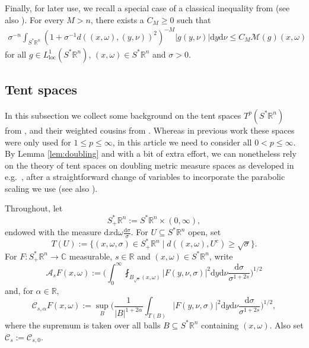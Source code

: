 \documentclass{amsart}
\newcommand {\A}{{\mathcal{A}}}
\newcommand {\C}{{\mathbb C}}
\newcommand {\Ca}{\mathcal{C}}
\newcommand {\ud}{\mathrm{d}}
\newcommand {\loc}{\mathrm{loc}}
\newcommand {\Ma}{\mathcal{M}}
\newcommand {\R}{\mathbb R}
\newcommand {\Rn}{\mathbb{R}^{n}}
\newcommand {\Sp}{S^{*}\Rn}
\newcommand {\Spp}{S^{*}_{+}\Rn}
\newcommand {\w}{\omega}
\theoremstyle{definition}
\numberwithin{equation}{section}
\begin{document}
Finally, for later use, we recall a special case of a classical inequality from \cite[Sections II.2.1 and II.5.14]{Stein93} (see also \cite[page 195]{FaLiRoSo23}). For every $M>n$, there exists a $C_{M}\geq0$ such that 
\begin{align}\label{eq:HLcontrol}
{\sigma}^{-n}\int_{\Sp}(1+{\sigma}^{-1}d((x,\omega),(y,\nu))^{2})^{-M}
|g(y,\nu)|\ud y\ud\nu
\leq C_{M}\Ma(g)(x,\omega)
\end{align}
for all $g\in L^{1}_{\loc}(\Sp)$, $(x,\w)\in\Sp$ and $\sigma>0$.






\subsection{Tent spaces}\label{subsec:tent}

In this subsection we collect some background on the tent spaces $T^{p}(\Sp)$ from \cite{HaPoRo20}, and their weighted cousins from \cite{Hassell-Rozendaal23}. Whereas in previous work these spaces were only used for $1\leq p\leq\infty$, in this article we need to consider all $0<p\leq \infty$. By Lemma \ref{lem:doubling} and with a bit of extra effort, we can nonetheless rely on the theory of tent spaces on doubling metric measure spaces as developed in e.g.~\cite{CoMeSt85, Amenta14,Amenta18}, after a straightforward change of variables to incorporate the parabolic scaling we use (see also \cite{AuKrMoPo12}).

Throughout, let 
\[
\Spp:=\Sp\times(0,\infty),
\]
endowed with the measure $\ud x\ud\w\frac{\ud\sigma}{\sigma}$. For $U\subseteq \Sp$ open, set
\[
T(U):=\{(x,\w,\sigma)\in\Spp\mid d((x,\w),U^{c})\geq \sqrt{\sigma}\}.
\]
For $F:\Spp\to \C$ measurable, $s\in\R$ and $(x,\w)\in\Sp$, write
\begin{equation}\label{eq:As}
\A_{s} F(x,\w):=\Big(\int_{0}^{\infty}\fint_{B_{\sqrt{\sigma}}(x,\w)}|F(y,\nu,\sigma)|^{2}\ud y\ud \nu\frac{\ud \sigma}{\sigma^{1+2s}}\Big)^{1/2}
\end{equation}
and, for $\alpha\in\R$,
\begin{equation}\label{eq:Cs}
\mathcal{C}_{s,\alpha}F(x,\w):=\sup_{B}\Big(\frac{1}{|B|^{1+2\alpha}}\int_{T(B)}|F(y,\nu,\sigma)|^{2}\ud y\ud \nu\frac{\ud \sigma}{\sigma^{1+2s}}\Big)^{1/2},
\end{equation}
where the supremum is taken over all balls $B\subseteq \Sp$ containing $(x,\w)$.  Also set $\Ca_{s}:=\Ca_{s,0}$.
\end{document}
